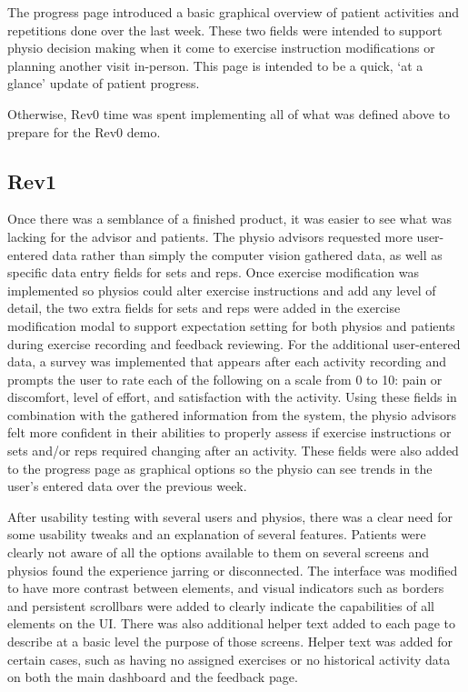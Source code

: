 \documentclass{article}
\begin{document}
The progress page introduced a basic graphical overview of patient activities and repetitions done over the last week. These two fields were intended to support physio decision making when it come to exercise instruction modifications or planning another visit in-person. This page is intended to be a quick, ‘at a glance’ update of patient progress.

Otherwise, Rev0 time was spent implementing all of what was defined above to prepare for the Rev0 demo.

\subsection{Rev1}

Once there was a semblance of a finished product, it was easier to see what was lacking for the advisor and patients. The physio advisors requested more user-entered data rather than simply the computer vision gathered data, as well as specific data entry fields for sets and reps. Once exercise modification was implemented so physios could alter exercise instructions and add any level of detail, the two extra fields for sets and reps were added in the exercise modification modal to support expectation setting for both physios and patients during exercise recording and feedback reviewing. For the additional user-entered data, a survey was implemented that appears after each activity recording and prompts the user to rate each of the following on a scale from 0 to 10: pain or discomfort, level of effort, and satisfaction with the activity. Using these fields in combination with the gathered information from the system, the physio advisors felt more confident in their abilities to properly assess if exercise instructions or sets and/or reps required changing after an activity. These fields were also added to the progress page as graphical options so the physio can see trends in the user’s entered data over the previous week.

After usability testing with several users and physios, there was a clear need for some usability tweaks and an explanation of several features. Patients were clearly not aware of all the options available to them on several screens and physios found the experience jarring or disconnected. The interface was modified to have more contrast between elements, and visual indicators such as borders and persistent scrollbars were added to clearly indicate the capabilities of all elements on the UI. There was also additional helper text added to each page to describe at a basic level the purpose of those screens. Helper text was added for certain cases, such as having no assigned exercises or no historical activity data on both the main dashboard and the feedback page.
\end{document}
